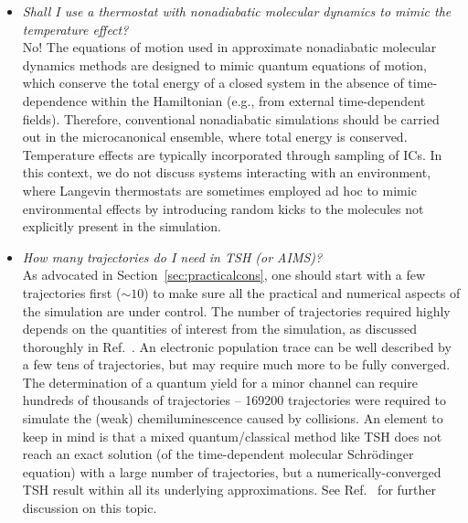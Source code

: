 \documentclass[9pt,bestpractices,pubversion]{livecoms}
\begin{document}
\begin{itemize}
{At this point, we also need to comment on the common issue of failed trajectories in the sample and how to deal with them when evaluating observables such as electronic populations. First, one should consider whether the trajectories can be artificially prolonged. For example, if the trajectory failed in the ground state and we know that the molecule never hops back to the excited state, we can consider the trajectory in the ground state until the final time. Yet, this assumption is not possible for trajectories failing in the excited state. These trajectories can be either discarded from the sample or considered in the statistics only up to the time they reach. Neither of these two approaches can be claimed to be better, and one should always try both of them. If the populations calculated by both approaches do not significantly differ, we can safely choose one of them. If there is a significant difference, one should always report on that and investigate the implications.
}

\item{\textit{Shall I use a thermostat with nonadiabatic molecular dynamics to mimic the temperature effect?} \\
No! The equations of motion used in approximate nonadiabatic molecular dynamics methods are designed to mimic quantum equations of motion, which conserve the total energy of a closed system in the absence of time-dependence within the Hamiltonian (e.g., from external time-dependent fields). Therefore, conventional nonadiabatic simulations should be carried out in the microcanonical ensemble, where total energy is conserved. Temperature effects are typically incorporated through sampling of ICs. In this context, we do not discuss systems interacting with an environment, where Langevin thermostats are sometimes employed ad hoc to mimic environmental effects by introducing random kicks to the molecules not explicitly present in the simulation. 
}

\item{\textit{How many trajectories do I need in TSH (or AIMS)?} \\
As advocated in Section~\ref{sec:practicalcons}, one should start with a few trajectories first ($\sim10$) to make sure all the practical and numerical aspects of the simulation are under control. The number of trajectories required highly depends on the quantities of interest from the simulation, as discussed thoroughly in Ref.~. An electronic population trace can be well described by a few tens of trajectories, but may require much more to be fully converged. The determination of a quantum yield for a minor channel can require hundreds of thousands of trajectories -- 169200 trajectories were required to simulate the (weak) chemiluminescence caused by  collisions.\cite{alvarezbarcia2013chemiluTSH}
An element to keep in mind is that a mixed quantum/classical method like TSH does not reach an exact solution (of the time-dependent molecular Schr\"{o}dinger equation) with a large number of trajectories, but a numerically-converged TSH result within all its underlying approximations. See Ref.~ for further discussion on this topic.
}


\end{itemize}
\end{document}
